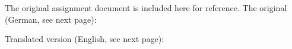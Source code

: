 The original assignment document is included here for reference. The original (German, see next page):



\clearpage
Translated version (English, see next page):

